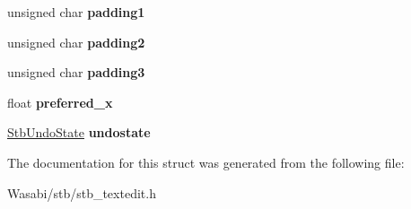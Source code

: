 \begin{DoxyCompactItemize}
\item 
unsigned char {\bfseries padding1}\hypertarget{struct_s_t_b___textedit_state_a1e43e8ac88a8c7f2bba645b333a8bdc7}{}\label{struct_s_t_b___textedit_state_a1e43e8ac88a8c7f2bba645b333a8bdc7}

\item 
unsigned char {\bfseries padding2}\hypertarget{struct_s_t_b___textedit_state_af5a708e49f23f79bb14c9b0f4ad03371}{}\label{struct_s_t_b___textedit_state_af5a708e49f23f79bb14c9b0f4ad03371}

\item 
unsigned char {\bfseries padding3}\hypertarget{struct_s_t_b___textedit_state_a4c42530e4919171df25b1f00bb95a887}{}\label{struct_s_t_b___textedit_state_a4c42530e4919171df25b1f00bb95a887}

\item 
float {\bfseries preferred\+\_\+x}\hypertarget{struct_s_t_b___textedit_state_a527319df94e0fe262548fb48bebf3dea}{}\label{struct_s_t_b___textedit_state_a527319df94e0fe262548fb48bebf3dea}

\item 
\hyperlink{struct_stb_undo_state}{Stb\+Undo\+State} {\bfseries undostate}\hypertarget{struct_s_t_b___textedit_state_a7e1f0366bbd57e01a4f49a720beb9ead}{}\label{struct_s_t_b___textedit_state_a7e1f0366bbd57e01a4f49a720beb9ead}

\end{DoxyCompactItemize}


The documentation for this struct was generated from the following file\+:\begin{DoxyCompactItemize}
\item 
Wasabi/stb/stb\+\_\+textedit.\+h\end{DoxyCompactItemize}

